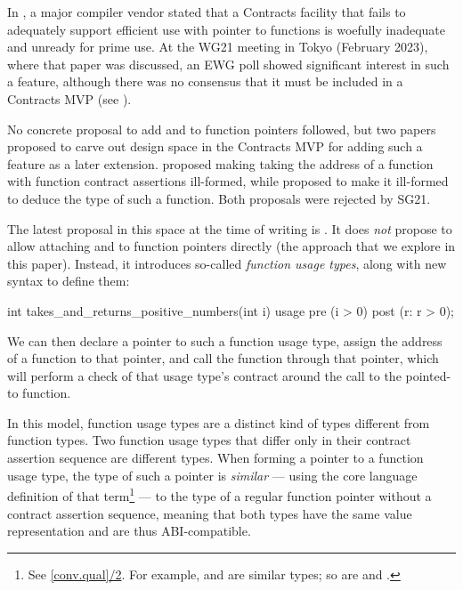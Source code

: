In \cite{P3173R0}, a major compiler vendor stated that a Contracts facility that fails to adequately support efficient use with pointer to functions is woefully inadequate and unready for prime use. At the WG21 meeting in Tokyo (February 2023), where that paper was discussed, an EWG poll showed significant interest in such a feature, although there was no consensus that it must be included in a Contracts MVP (see \cite{P3197R0}).

No concrete proposal to add  and  to function pointers followed, but two papers proposed to carve out design space in the Contracts MVP for adding such a feature as a later extension. \cite{P3221R0} proposed making taking the address of a function with function contract assertions ill-formed, while \cite{P3250R0} proposed to make it ill-formed to deduce the type of such a function. Both proposals were rejected by SG21.

The latest proposal in this space at the time of writing is \cite{P3271R0}. It does \emph{not} propose to allow attaching  and  to function pointers directly (the approach that we explore in this paper). Instead, it introduces so-called \emph{function usage types}, along with new syntax to define them:
\begin{codeblock}
int takes_and_returns_positive_numbers(int i) usage 
  pre (i > 0)
  post (r: r > 0);
\end{codeblock}
We can then declare a pointer to such a function usage type, assign the address of a function to that pointer, and call the function through that pointer, which will perform a check of that usage type's contract around the call to the pointed-to function.

In this model, function usage types are a distinct kind of types different from function types. Two function usage types that differ only in their contract assertion sequence are different types. When forming a pointer to a function usage type, the type of such a pointer is \emph{similar} --- using the core language definition of that term\footnote{See \href{https://timsong-cpp.github.io/cppwp/n4950/conv.qual\#2}{[conv.qual]/2}. For example,   and  are similar types; so are  and .} --- to the type of a regular function pointer without a contract assertion sequence, meaning that both types have the same value representation and are thus ABI-compatible.


